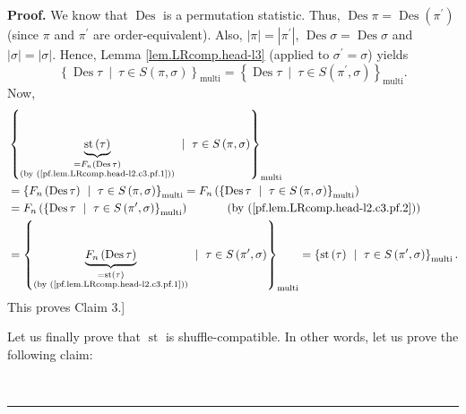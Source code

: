 \documentclass[numbers=enddot,12pt,final,onecolumn,notitlepage]{scrartcl}%
\theoremstyle{definition}
\newenvironment{proof}[1][Proof]{\noindent\textbf{#1.} }{\ \rule{0.5em}{0.5em}}
\newenvironment{verlong}{}{}
\begin{document}
\begin{verlong}
\begin{proof}
We know that $\operatorname*{Des}$ is a permutation statistic. Thus,
$\operatorname*{Des}\pi=\operatorname*{Des}\left(  \pi^{\prime}\right)  $
(since $\pi$ and $\pi^{\prime}$ are order-equivalent). Also, $\left\vert
\pi\right\vert =\left\vert \pi^{\prime}\right\vert $, $\operatorname*{Des}%
\sigma=\operatorname*{Des}\sigma$ and $\left\vert \sigma\right\vert
=\left\vert \sigma\right\vert $. Hence, Lemma \ref{lem.LRcomp.head-l3}
(applied to $\sigma^{\prime}=\sigma$) yields
\begin{equation}
\left\{  \operatorname*{Des}\tau\ \mid\ \tau\in S\left(  \pi,\sigma\right)
\right\}  _{\operatorname*{multi}}=\left\{  \operatorname*{Des}\tau
\ \mid\ \tau\in S\left(  \pi^{\prime},\sigma\right)  \right\}
_{\operatorname*{multi}}. \label{pf.lem.LRcomp.head-l2.c3.pf.2}%
\end{equation}
Now,
\begin{align*}
&  \left\{  \underbrace{\operatorname*{st}\left(  \tau\right)  }%
_{\substack{=F_{n}\left(  \operatorname*{Des}\tau\right)  \\\text{(by
(\ref{pf.lem.LRcomp.head-l2.c3.pf.1}))}}}\ \mid\ \tau\in S\left(  \pi
,\sigma\right)  \right\}  _{\operatorname*{multi}}\\
&  =\left\{  F_{n}\left(  \operatorname*{Des}\tau\right)  \ \mid\ \tau\in
S\left(  \pi,\sigma\right)  \right\}  _{\operatorname*{multi}}=F_{n}\left(
\left\{  \operatorname*{Des}\tau\ \mid\ \tau\in S\left(  \pi,\sigma\right)
\right\}  _{\operatorname*{multi}}\right) \\
&  =F_{n}\left(  \left\{  \operatorname*{Des}\tau\ \mid\ \tau\in S\left(
\pi^{\prime},\sigma\right)  \right\}  _{\operatorname*{multi}}\right)
\ \ \ \ \ \ \ \ \ \ \left(  \text{by (\ref{pf.lem.LRcomp.head-l2.c3.pf.2}%
)}\right) \\
&  =\left\{  \underbrace{F_{n}\left(  \operatorname*{Des}\tau\right)
}_{\substack{=\operatorname*{st}\left(  \tau\right)  \\\text{(by
(\ref{pf.lem.LRcomp.head-l2.c3.pf.1}))}}}\ \mid\ \tau\in S\left(  \pi^{\prime
},\sigma\right)  \right\}  _{\operatorname*{multi}}=\left\{
\operatorname*{st}\left(  \tau\right)  \ \mid\ \tau\in S\left(  \pi^{\prime
},\sigma\right)  \right\}  _{\operatorname*{multi}}.
\end{align*}
This proves Claim 3.]

Let us finally prove that $\operatorname*{st}$ is shuffle-compatible. In other
words, let us prove the following claim:


\end{proof}
\end{verlong}
\end{document}
